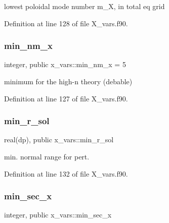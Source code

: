lowest poloidal mode number {\ttfamily m\+\_\+X}, in total eq grid 



Definition at line 128 of file X\+\_\+vars.\+f90.

\mbox{\label{namespacex__vars_adec89f548ba63e203297222dce675b94}} 
\subsubsection{\texorpdfstring{min\+\_\+nm\+\_\+x}{min\_nm\_x}}
{\footnotesize\ttfamily integer, public x\+\_\+vars\+::min\+\_\+nm\+\_\+x = 5}



minimum for the high-\/n theory (debable) 



Definition at line 127 of file X\+\_\+vars.\+f90.

\mbox{\label{namespacex__vars_a50c610efcf5afa4ec4b0eb7119b5d520}} 
\subsubsection{\texorpdfstring{min\+\_\+r\+\_\+sol}{min\_r\_sol}}
{\footnotesize\ttfamily real(dp), public x\+\_\+vars\+::min\+\_\+r\+\_\+sol}



min. normal range for pert. 



Definition at line 132 of file X\+\_\+vars.\+f90.

\mbox{\label{namespacex__vars_a0d63825aabc4c71623c6ea7ffe033949}} 
\subsubsection{\texorpdfstring{min\+\_\+sec\+\_\+x}{min\_sec\_x}}
{\footnotesize\ttfamily integer, public x\+\_\+vars\+::min\+\_\+sec\+\_\+x}



